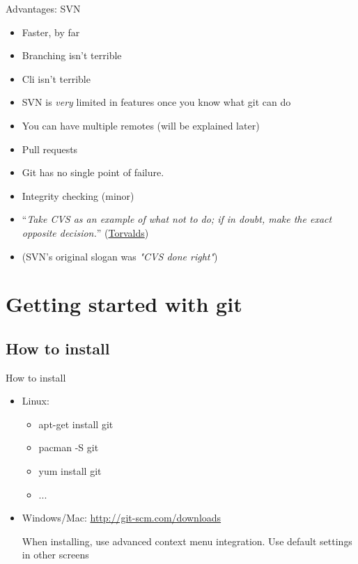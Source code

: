 \documentclass[10pt,a4paper]{beamer}
\begin{document}
\begin{frame}{Advantages: SVN}
\begin{itemize}
\item Faster, by far
\item Branching isn't terrible
\item Cli isn't terrible
\item SVN is \textit{very} limited in features once you know what git can do
\item You can have multiple remotes (will be explained later)
\item Pull requests
\item Git has no single point of failure.
\item Integrity checking (minor)
\item ``\textit{Take CVS as an example of what not to do; if in doubt, make the exact opposite decision.}'' (\href{http://www.youtube.com/watch?v=4XpnKHJAok8\&t=2m30s}{\color{blue}Torvalds})
\item (SVN's original slogan was \textit{"CVS done right"})

\end{itemize}
\end{frame}


\section{Getting started with git}


\subsection{How to install}
\begin{frame}{How to install}
\begin{itemize}
\item Linux:
\begin{itemize}
\item apt-get install git
\item pacman -S git
\item yum install git
\item ...
\end{itemize}
\item Windows/Mac: \href{http://git-scm.com/downloads}{\color{blue}http://git-scm.com/downloads}

When installing, use advanced context menu integration. Use default settings in other screens
\end{itemize}
\end{frame}
\end{document}

